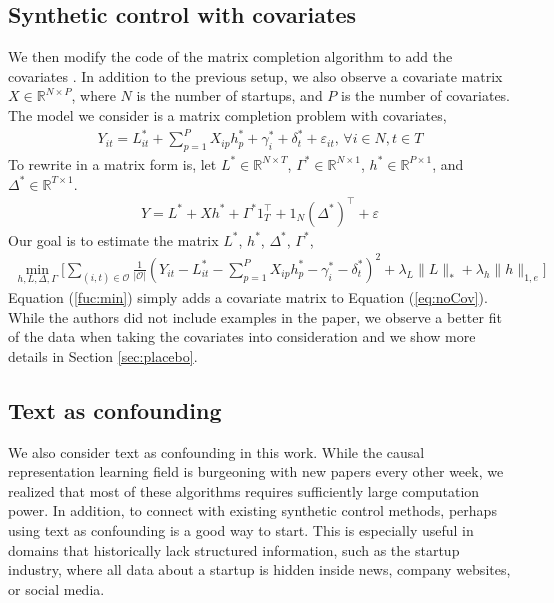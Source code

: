 \documentclass[12pt]{article}
\begin{document}
\subsection{Synthetic control with covariates}
\label{scc}
We then modify the code of the matrix completion algorithm to add the covariates \cite{athey2021matrix}. In addition to the previous setup, we also observe a covariate matrix $X \in \mathbb{R}^{N \times P}$, where $N$ is the number of startups, and $P$ is the number of covariates. The model we consider is a matrix completion problem with covariates,
\begin{align*}
    Y_{it} = L_{it}^* + \sum_{p=1}^P X_{ip}h_p^* + \gamma_i^* + \delta_t^* + \varepsilon_{it} \text{,   } \forall i \in N, t\in T
\end{align*}
To rewrite in a matrix form is, let $L^* \in \mathbb{R}^{N \times T}$, $\Gamma^* \in \mathbb{R}^{N \times 1}$, $h^* \in \mathbb{R}^{P \times 1}$, and $\Delta^* \in \mathbb{R}^{T\times 1}$.
\begin{align*}
    Y = L^* + Xh^* + \Gamma^* 1_T^\top  + 1_N(\Delta^*)^\top + \varepsilon
\end{align*}
Our goal is to estimate the matrix $L^*$, $h^*$, $\Delta^*$, $\Gamma^*$, \cite{athey2021matrix}
\begin{align}
    \label{fuc:min}
    \min_{h, L, \Delta, \Gamma} \bigg[ \sum_{(i, t)\in \mathcal{O}} \frac{1}{|\mathcal{O}|}(Y_{it} - L_{it}^* - \sum_{p=1}^P X_{ip}h_p^* - \gamma_i^* - \delta_t^*)^2  + \lambda_L \|L\|_* + \lambda_h \|h\|_{1,e} \bigg]
\end{align}
Equation (\ref{fuc:min}) simply adds a covariate matrix to Equation (\ref{eq:noCov}). While the authors did not include examples in the paper, we observe a better fit of the data when taking the covariates into consideration and we show more details in Section \ref{sec:placebo}.

\subsection{Text as confounding}
We also consider text as confounding in this work. While the causal representation learning field is burgeoning with new papers every other week, we realized that most of these algorithms requires sufficiently large computation power. In addition, to connect with existing synthetic control methods, perhaps using text as confounding is a good way to start. This is especially useful in domains that historically lack structured information, such as the startup industry, where all data about a startup is hidden inside news, company websites, or social media.
\end{document}
